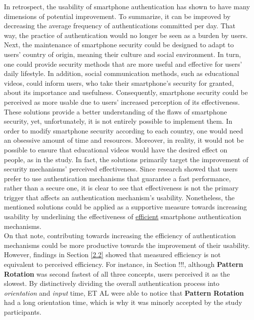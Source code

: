 In retrospect, the usability of smartphone authentication has shown to have many dimensions of potential improvement. To summarize, it can be improved by decreasing the average frequency of authentications committed per day. That way, the practice of authentication would no longer be seen as a burden by users. Next, the maintenance of smartphone security could be designed to adapt to users' country of origin, meaning their culture and social environment. In turn, one could provide security methods that are more useful and effective for users' daily lifestyle. In addition, social communication methods, such as educational videos, could inform users, who take their smartphone's security for granted, about its importance and usefulness. Consequently, smartphone security could be perceived as more usable due to users' increased perception of its effectiveness. \\

These solutions provide a better understanding of the flaws of smartphone security, yet, unfortunately, it is not entirely possible to implement them. In order to modify smartphone security according to each country, one would need an obsessive amount of time and resources. Moreover, in reality, it would not be possible to ensure that educational videos would have the desired effect on people, as in the study. In fact, the solutions primarily target the improvement of security mechanisms' perceived effectiveness.
Since research showed that users prefer to use  authentication mechanisms that guarantee a fast performance, rather than a secure one, it is clear to see that effectiveness is not the primary trigger that affects an authentication mechanism's usability. Nonetheless, the mentioned solutions could be applied as a supportive measure towards increasing usability by underlining the effectiveness of \underline{efficient} smartphone authentication mechanisms. \\

On that note, contributing towards increasing the efficiency of authentication mechanisms could be more productive towards the improvement of their usability. However, findings in Section \ref{2.2} showed that measured efficiency is not equivalent to perceived efficiency. For instance, in Section !!!, although \textbf{Pattern Rotation} was second fastest of all three concepts, users perceived it as the slowest. By distinctively dividing the overall authentication process into \textit{orientation} and \textit{input} time, ET AL were able to notice that \textbf{Pattern Rotation} had a long orientation time, which is why it was minorly accepted by the study participants.  \\

